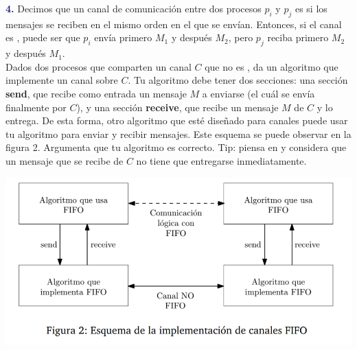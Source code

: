 \newpage
\textbf{\textcolor{MidnightBlue}{4.}}
Decimos que un canal de comunicación entre dos procesos $p_i$ y $p_j$ es  si los
mensajes se reciben en el mismo orden en el que se envían. Entonces, si el canal 
es , puede ser que $p_i$ envía primero $M_1$ y después $M_2$, pero $p_j$
reciba primero $M_2$ y después $M_1$.\\

Dados dos procesos que comparten un canal $C$ que no es , da un algoritmo que
implemente un canal  sobre $C$. Tu algoritmo debe tener dos secciones: una sección
{\bf send}, que recibe como entrada un mensaje $M$ a enviarse (el cuál se envía finalmente
por $C$), y una sección {\bf receive}, que recibe un mensaje $M$ de $C$ y lo entrega. De esta
forma, otro algoritmo que esté diseñado para canales  puede usar tu algoritmo para
enviar y recibir mensajes. Este esquema se puede observar en la figura 2. Argumenta que tu
algoritmo es correcto. Tip: piensa en  y considera que un mensaje que se
recibe de $C$ no tiene que entregarse inmediatamente.

\begin{center}
    \includegraphics[scale=0.5]{Grapho1.png}
    \end{center}

